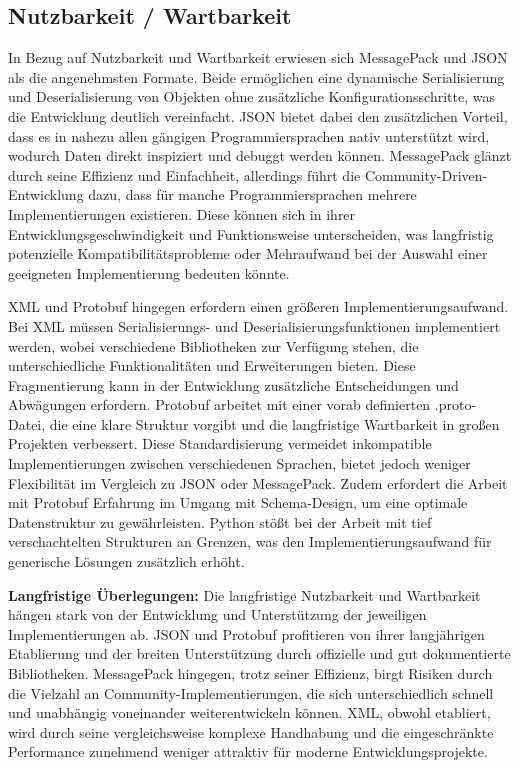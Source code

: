 \documentclass[ngerman]{seminarvorlage}
\begin{document}
\subsection{Nutzbarkeit / Wartbarkeit}
In Bezug auf Nutzbarkeit und Wartbarkeit erwiesen sich MessagePack und JSON als die angenehmsten Formate. Beide ermöglichen eine dynamische Serialisierung und Deserialisierung von Objekten ohne zusätzliche Konfigurationsschritte, was die Entwicklung deutlich vereinfacht. JSON bietet dabei den zusätzlichen Vorteil, dass es in nahezu allen gängigen Programmiersprachen nativ unterstützt wird, wodurch Daten direkt inspiziert und debuggt werden können. MessagePack glänzt durch seine Effizienz und Einfachheit, allerdings führt die Community-Driven-Entwicklung dazu, dass für manche Programmiersprachen mehrere Implementierungen existieren. Diese können sich in ihrer Entwicklungsgeschwindigkeit und Funktionsweise unterscheiden, was langfristig potenzielle Kompatibilitätsprobleme oder Mehraufwand bei der Auswahl einer geeigneten Implementierung bedeuten könnte.

XML und Protobuf hingegen erfordern einen größeren Implementierungsaufwand. Bei XML müssen Serialisierungs- und Deserialisierungsfunktionen implementiert werden, wobei verschiedene Bibliotheken zur Verfügung stehen, die unterschiedliche Funktionalitäten und Erweiterungen bieten. Diese Fragmentierung kann in der Entwicklung zusätzliche Entscheidungen und Abwägungen erfordern. Protobuf arbeitet mit einer vorab definierten .proto-Datei, die eine klare Struktur vorgibt und die langfristige Wartbarkeit in großen Projekten verbessert. Diese Standardisierung vermeidet inkompatible Implementierungen zwischen verschiedenen Sprachen, bietet jedoch weniger Flexibilität im Vergleich zu JSON oder MessagePack. Zudem erfordert die Arbeit mit Protobuf Erfahrung im Umgang mit Schema-Design, um eine optimale Datenstruktur zu gewährleisten. Python stößt bei der Arbeit mit tief verschachtelten Strukturen an Grenzen, was den Implementierungsaufwand für generische Lösungen zusätzlich erhöht.

\textbf{Langfristige Überlegungen:}
Die langfristige Nutzbarkeit und Wartbarkeit hängen stark von der Entwicklung und Unterstützung der jeweiligen Implementierungen ab. JSON und Protobuf profitieren von ihrer langjährigen Etablierung und der breiten Unterstützung durch offizielle und gut dokumentierte Bibliotheken. MessagePack hingegen, trotz seiner Effizienz, birgt Risiken durch die Vielzahl an Community-Implementierungen, die sich unterschiedlich schnell und unabhängig voneinander weiterentwickeln können. XML, obwohl etabliert, wird durch seine vergleichsweise komplexe Handhabung und die eingeschränkte Performance zunehmend weniger attraktiv für moderne Entwicklungsprojekte.
\end{document}
